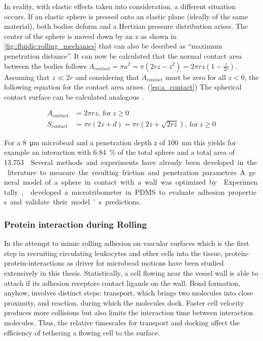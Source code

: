 In reality, with elastic effects taken into consideration, a different situation occurs. If an elastic sphere is pressed onto an elastic plane (ideally of the same material), both bodies deform and a Hertzian pressure distribution arises. The center of the sphere is moved down by an \gls{z} as shown in \cref{fig::fluidic:rolling_mechanics} that can also be desribed as ``maximum penetration distance''. It can now be calculated that the normal contact area between the bodies follows $A_{contact} = \pi a^{2}=\pi\left(2 r z-z^{2}\right)=2 \pi r z\left(1-\frac{z}{2 r}\right)$. Assuming that $z \ll 2r$ and considering that $A_{contact}$ must be zero for all $z < 0$, the following equation for the contact area arises. (\cref{eq:a_contact}) The spherical contact surface can be calculated analogous .\cite{lit:fluid:rolling:contact_ground_plane}

\begin{align}
	A_{contact} &= 2\pi r z \mathrm{, \ for \ } z \geq 0 \label{eq:a_contact}\\
	S_{contact} &= \pi r (2z + d) = \pi r (2z + \sqrt{2 r z})  \mathrm{, \ for \ } z \geq 0 \label{eq:s_contact}
\end{align}

For a \SI{8}{\micro\meter} microbead and a penetration depth \gls{z} of \SI{100}{\nano\meter} this yields for example an interaction with \SI{6.84}{\percent} of the total sphere and a total area of \SI{13.753}{\micro\meter\square}. Several methods and experiments have already been developed in the literature to measure the resulting friction and penetration parameters. A general model of a sphere in contact with a wall was optimized by \citet{lit:fluid:sphere_planeWall}. Experimentally, \citet{lit:fluid:rolling:contact} developed a microtribometer in PDMS to evaluate adhesion properties and validate their model's predictions.

\subsubsection{Protein interaction during Rolling}
In the attempt to mimic rolling adhesion on vascular surfaces which is the first step in recruiting circulating leukocytes and other cells into the tissue, protein-protein-interactions as driver for microbead motions have been studied extensively in this thesis. Statistically, a cell flowing near the vessel wall is able to attach if its adhesion receptors contact ligands on the wall. Bond formation, anyhow, involves distinct steps: transport, which brings two molecules into close proximity, and reaction, during which the molecules dock. Faster cell velocity produces more collisions but also limits the interaction time between interaction molecules. Thus, the relative timescales for transport and docking affect the efficiency of tethering a flowing cell to the surface.\cite{lit:bio:CellAdhesion}

